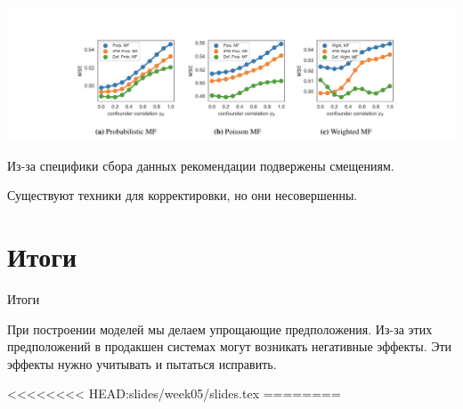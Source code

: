 \documentclass[11pt,aspectratio=169,handout]{beamer}
\begin{document}
\begin{frame}

\begin{center}
\includegraphics[scale=0.6]{images/deconf-result.png}
\end{center}

\end{frame}

\begin{frame}

\begin{tcolorbox}[colback=info!5,colframe=info!80,title=]
Из-за специфики сбора данных рекомендации подвержены смещениям. 
\end{tcolorbox}
\begin{tcolorbox}[colback=info!5,colframe=info!80,title=]
Существуют техники для корректировки, но они несовершенны.
\end{tcolorbox}

\end{frame}

\section{Итоги}

\begin{frame}{Итоги}

\begin{tcolorbox}[colback=info!5,colframe=info!80,title=]
При построении моделей мы делаем упрощающие предположения. Из-за этих предположений в продакшен системах могут возникать негативные эффекты. Эти эффекты нужно учитывать и пытаться исправить.
\end{tcolorbox}

<<<<<<<< HEAD:slides/week05/slides.tex
========
\end{frame}
\end{document}
